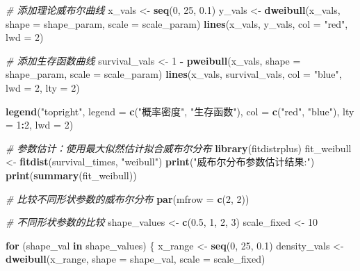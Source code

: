 \documentclass[
]{book}
\newenvironment{Shaded}{\begin{snugshade}}{\end{snugshade}}
\newcommand{\AttributeTok}[1]{\textcolor[rgb]{0.13,0.29,0.53}{#1}}
\newcommand{\CommentTok}[1]{\textcolor[rgb]{0.56,0.35,0.01}{\textit{#1}}}
\newcommand{\ControlFlowTok}[1]{\textcolor[rgb]{0.13,0.29,0.53}{\textbf{#1}}}
\newcommand{\DecValTok}[1]{\textcolor[rgb]{0.00,0.00,0.81}{#1}}
\newcommand{\FloatTok}[1]{\textcolor[rgb]{0.00,0.00,0.81}{#1}}
\newcommand{\FunctionTok}[1]{\textcolor[rgb]{0.13,0.29,0.53}{\textbf{#1}}}
\newcommand{\NormalTok}[1]{#1}
\newcommand{\OtherTok}[1]{\textcolor[rgb]{0.56,0.35,0.01}{#1}}
\newcommand{\SpecialCharTok}[1]{\textcolor[rgb]{0.81,0.36,0.00}{\textbf{#1}}}
\newcommand{\StringTok}[1]{\textcolor[rgb]{0.31,0.60,0.02}{#1}}
\begin{document}
\begin{Shaded}
\begin{Highlighting}[]
\CommentTok{\# 添加理论威布尔曲线}
\NormalTok{x\_vals }\OtherTok{\textless{}{-}} \FunctionTok{seq}\NormalTok{(}\DecValTok{0}\NormalTok{, }\DecValTok{25}\NormalTok{, }\FloatTok{0.1}\NormalTok{)}
\NormalTok{y\_vals }\OtherTok{\textless{}{-}} \FunctionTok{dweibull}\NormalTok{(x\_vals, }\AttributeTok{shape =}\NormalTok{ shape\_param, }\AttributeTok{scale =}\NormalTok{ scale\_param)}
\FunctionTok{lines}\NormalTok{(x\_vals, y\_vals, }\AttributeTok{col =} \StringTok{"red"}\NormalTok{, }\AttributeTok{lwd =} \DecValTok{2}\NormalTok{)}

\CommentTok{\# 添加生存函数曲线}
\NormalTok{survival\_vals }\OtherTok{\textless{}{-}} \DecValTok{1} \SpecialCharTok{{-}} \FunctionTok{pweibull}\NormalTok{(x\_vals, }\AttributeTok{shape =}\NormalTok{ shape\_param, }\AttributeTok{scale =}\NormalTok{ scale\_param)}
\FunctionTok{lines}\NormalTok{(x\_vals, survival\_vals, }\AttributeTok{col =} \StringTok{"blue"}\NormalTok{, }\AttributeTok{lwd =} \DecValTok{2}\NormalTok{, }\AttributeTok{lty =} \DecValTok{2}\NormalTok{)}

\FunctionTok{legend}\NormalTok{(}\StringTok{"topright"}\NormalTok{, }\AttributeTok{legend =} \FunctionTok{c}\NormalTok{(}\StringTok{"概率密度"}\NormalTok{, }\StringTok{"生存函数"}\NormalTok{),}
       \AttributeTok{col =} \FunctionTok{c}\NormalTok{(}\StringTok{"red"}\NormalTok{, }\StringTok{"blue"}\NormalTok{), }\AttributeTok{lty =} \DecValTok{1}\SpecialCharTok{:}\DecValTok{2}\NormalTok{, }\AttributeTok{lwd =} \DecValTok{2}\NormalTok{)}

\CommentTok{\# 参数估计：使用最大似然估计拟合威布尔分布}
\FunctionTok{library}\NormalTok{(fitdistrplus)}
\NormalTok{fit\_weibull }\OtherTok{\textless{}{-}} \FunctionTok{fitdist}\NormalTok{(survival\_times, }\StringTok{"weibull"}\NormalTok{)}
\FunctionTok{print}\NormalTok{(}\StringTok{"威布尔分布参数估计结果:"}\NormalTok{)}
\FunctionTok{print}\NormalTok{(}\FunctionTok{summary}\NormalTok{(fit\_weibull))}

\CommentTok{\# 比较不同形状参数的威布尔分布}
\FunctionTok{par}\NormalTok{(}\AttributeTok{mfrow =} \FunctionTok{c}\NormalTok{(}\DecValTok{2}\NormalTok{, }\DecValTok{2}\NormalTok{))}

\CommentTok{\# 不同形状参数的比较}
\NormalTok{shape\_values }\OtherTok{\textless{}{-}} \FunctionTok{c}\NormalTok{(}\FloatTok{0.5}\NormalTok{, }\DecValTok{1}\NormalTok{, }\DecValTok{2}\NormalTok{, }\DecValTok{3}\NormalTok{)}
\NormalTok{scale\_fixed }\OtherTok{\textless{}{-}} \DecValTok{10}

\ControlFlowTok{for}\NormalTok{ (shape\_val }\ControlFlowTok{in}\NormalTok{ shape\_values) \{}
\NormalTok{  x\_range }\OtherTok{\textless{}{-}} \FunctionTok{seq}\NormalTok{(}\DecValTok{0}\NormalTok{, }\DecValTok{25}\NormalTok{, }\FloatTok{0.1}\NormalTok{)}
\NormalTok{  density\_vals }\OtherTok{\textless{}{-}} \FunctionTok{dweibull}\NormalTok{(x\_range, }\AttributeTok{shape =}\NormalTok{ shape\_val, }\AttributeTok{scale =}\NormalTok{ scale\_fixed)}


\end{Highlighting}
\end{Shaded}
\end{document}

